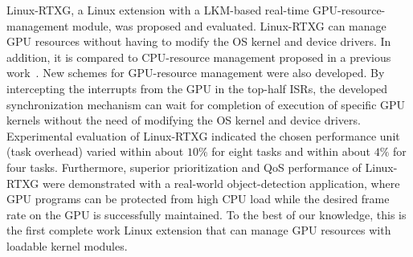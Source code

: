 \label{sec:conclusion}
Linux-RTXG, a Linux extension with a LKM-based real-time GPU-resource-management module, was proposed and evaluated.
Linux-RTXG can manage GPU resources without having to modify the OS kernel and device drivers.
In addition, it is compared to CPU-resource management proposed in a previous work~\cite{kato2009loadable, asberg2012exsched}.
New schemes for GPU-resource management were also developed.
By intercepting the interrupts from the GPU in the top-half ISRs, the developed synchronization mechanism can wait for completion of execution of specific GPU kernels without the need of modifying the OS kernel and device drivers.
Experimental evaluation of Linux-RTXG indicated the chosen performance unit (task overhead) varied within about $10\%$ for eight tasks and within about $4\%$ for four tasks.
Furthermore, superior prioritization and QoS performance of Linux-RTXG were demonstrated with a real-world object-detection application, where GPU programs can be protected from high CPU load while the desired frame rate on the GPU is successfully maintained.
To the best of our knowledge, this is the first complete work Linux extension that can manage GPU resources with loadable kernel modules.
